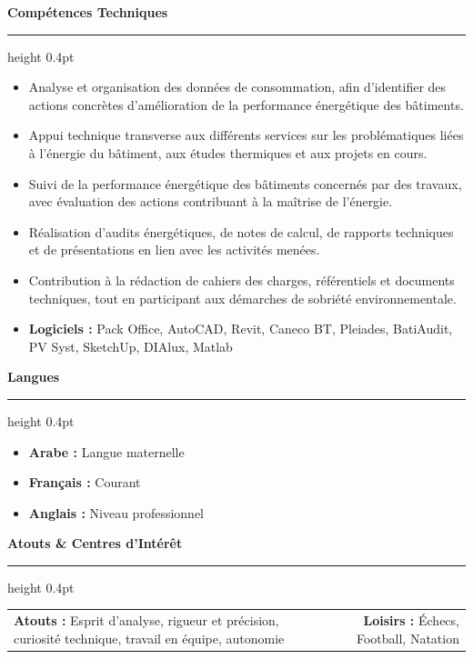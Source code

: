 \documentclass[9pt, a4paper]{article}
\newcommand{\cvsection}[1]{%
  \vspace{3pt}
  {\normalsize \textbf{\textcolor{accentblue}{#1}}}
  \vspace{1pt}
  \hrule height 0.4pt
  \vspace{3pt}
}
\begin{document}
\vspace{5pt}
\cvsection{Compétences Techniques}
\begin{itemize}[leftmargin=1em, itemsep=2pt, topsep=0pt, parsep=0pt, label={---}]
  \item Analyse et organisation des données de consommation, afin d'identifier des actions concrètes d'amélioration de la performance énergétique des bâtiments.
  \item Appui technique transverse aux différents services sur les problématiques liées à l'énergie du bâtiment, aux études thermiques et aux projets en cours.
  \item Suivi de la performance énergétique des bâtiments concernés par des travaux, avec évaluation des actions contribuant à la maîtrise de l'énergie.
  \item Réalisation d'audits énergétiques, de notes de calcul, de rapports techniques et de présentations en lien avec les activités menées.
  \item Contribution à la rédaction de cahiers des charges, référentiels et documents techniques, tout en participant aux démarches de sobriété environnementale.
  \item \textbf{Logiciels :} Pack Office, AutoCAD, Revit, Caneco BT, Pleiades, BatiAudit, PV Syst, SketchUp, DIAlux, Matlab
\end{itemize}

\vspace{5pt}
\cvsection{Langues}
\begin{itemize}[leftmargin=1em, itemsep=1pt, topsep=0pt, parsep=0pt, label={---}]
  \item \textbf{Arabe :} Langue maternelle
  \item \textbf{Français :} Courant
  \item \textbf{Anglais :} Niveau professionnel
\end{itemize}

\vspace{5pt}
\cvsection{Atouts \& Centres d'Intérêt}
\begin{tabularx}{\linewidth}{@{} X r @{}}
  \textbf{Atouts :} Esprit d'analyse, rigueur et précision, curiosité technique, travail en équipe, autonomie &
  \textbf{Loisirs :} Échecs, Football, Natation \\
\end{tabularx}
\end{document}
